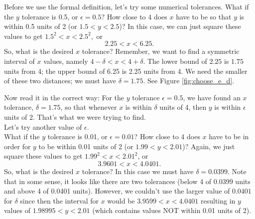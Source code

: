 {Before we use the formal definition, let's try some numerical tolerances.  What if the $y$ tolerance is 0.5, or $\epsilon =0.5$?  How close to 4 does $x$ have to be so that $y$ is within 0.5 units of 2 (or $1.5 < y < 2.5$)?  In this case, we can just square these values to get
$1.5^2 < x < 2.5^2,$ or $$2.25 < x < 6.25.$$
So, what is the desired $x$ tolerance?  Remember, we want to find a symmetric interval of $x$ values, namely
$4 - \delta < x < 4 + \delta$.  The lower bound of $2.25$ is $1.75$ units from 4; the upper bound of 6.25 is 2.25 units from 4. We need the smaller of these two distances; we must have $\delta = 1.75$. See Figure \ref{fig:choose_e_d}.\\

%
{
}
{
}
		

Now read it in the correct way:  For the $y$ tolerance $\epsilon =0.5$, we have found an $x$ tolerance, $\delta = 1.75$, so that whenever $x$ is within $\delta$ units of 4, then $y$ is within $\epsilon$ units of 2.  That's what we were trying to find.\\
  
Let's try another value of $\epsilon$.\\

What if the $y$ tolerance is 0.01, or $\epsilon =0.01$?  How close to 4 does $x$ have to be in order for $y$ to be within 0.01 units of 2 (or $1.99 < y < 2.01$)?  Again, we just square these values to get
$1.99^2 < x < 2.01^2$, or $$3.9601 < x < 4.0401.$$  So, what is the desired $x$ tolerance?  In this case we must have $\delta = 0.0399$.  Note that in some sense, it looks like there are two tolerances (below 4 of 0.0399 units and above 4 of 0.0401 units).  However, we couldn't use the larger value of $0.0401$ for $\delta$ since then the interval for $x$ would be  $3.9599 < x < 4.0401$ resulting in $y$ values of $1.98995 < y < 2.01$ (which contains values NOT within 0.01 units of 2).\\

}
